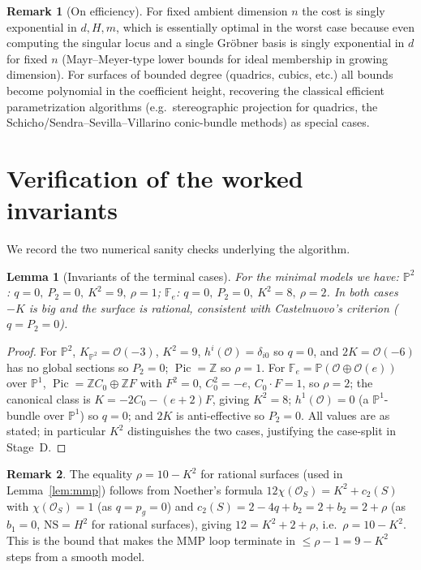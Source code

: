 \documentclass{amsart}
\theoremstyle{plain}
\newtheorem{lemma}{Lemma}
\theoremstyle{definition}
\newtheorem{remark}{Remark}
\newcommand{\PP}{\mathbb{P}}
\newcommand{\cO}{\mathcal{O}}
\DeclareMathOperator{\Pic}{Pic}
\begin{document}
\begin{remark}[On efficiency]
For fixed ambient dimension $n$ the cost is singly exponential in $d,H,m$, which
is essentially optimal in the worst case because even computing the singular
locus and a single Gr\"obner basis is singly exponential in $d$ for fixed $n$
(Mayr--Meyer-type lower bounds for ideal membership in growing dimension).  For
surfaces of bounded degree (quadrics, cubics, etc.) all bounds become polynomial
in the coefficient height, recovering the classical efficient parametrization
algorithms (e.g.\ stereographic projection for quadrics, the
Schicho/Sendra--Sevilla--Villarino conic-bundle methods) as special cases.
\end{remark}

\section{Verification of the worked invariants}

We record the two numerical sanity checks underlying the algorithm.

\begin{lemma}[Invariants of the terminal cases]\label{lem:invariants}
For the minimal models we have:
$\PP^2$: $q=0,\ P_2=0,\ K^2=9,\ \rho=1$;\quad
$\mathbb F_e$: $q=0,\ P_2=0,\ K^2=8,\ \rho=2$.
In both cases $-K$ is big and the surface is rational, consistent with
Castelnuovo's criterion ($q=P_2=0$).
\end{lemma}

\begin{proof}
For $\PP^2$, $K_{\PP^2}=\cO(-3)$, $K^2=9$, $h^i(\cO)=\delta_{i0}$ so $q=0$, and
$2K=\cO(-6)$ has no global sections so $P_2=0$; $\Pic=\mathbb Z$ so $\rho=1$.
For $\mathbb F_e=\PP(\cO\oplus\cO(e))$ over $\PP^1$, $\Pic=\mathbb Z C_0\oplus
\mathbb Z F$ with $F^2=0$, $C_0^2=-e$, $C_0\cdot F=1$, so $\rho=2$; the canonical
class is $K=-2C_0-(e+2)F$, giving $K^2=8$; $h^1(\cO)=0$ (a $\PP^1$-bundle over
$\PP^1$) so $q=0$; and $2K$ is anti-effective so $P_2=0$.  All values are as
stated; in particular $K^2$ distinguishes the two cases, justifying the
case-split in Stage~D.
\end{proof}

\begin{remark}
The equality $\rho=10-K^2$ for rational surfaces (used in
Lemma~\ref{lem:mmp}) follows from Noether's formula
$12\chi(\cO_S)=K^2+c_2(S)$ with $\chi(\cO_S)=1$ (as $q=p_g=0$) and
$c_2(S)=2-4q+b_2=2+b_2=2+\rho$ (as $b_1=0$, $\mathrm{NS}=H^2$ for rational
surfaces), giving $12=K^2+2+\rho$, i.e.\ $\rho=10-K^2$.  This is the bound that
makes the MMP loop terminate in $\le\rho-1=9-K^2$ steps from a smooth model.
\end{remark}
\end{document}
